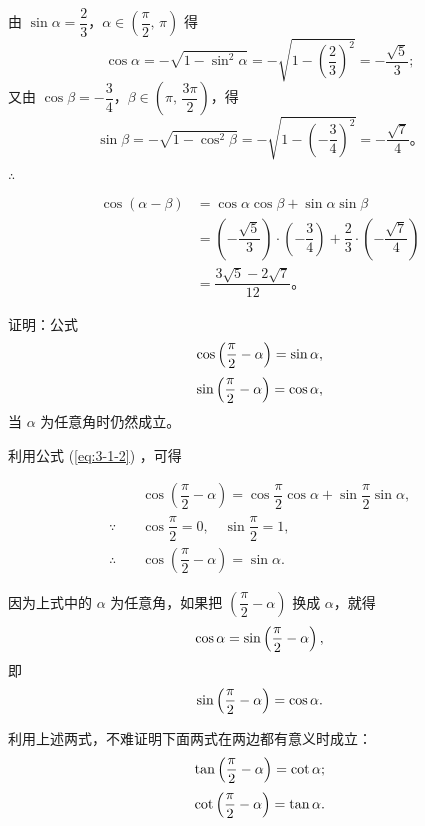 \jie 由 $\sin\alpha = \dfrac 2 3$，$\alpha \in \left( \dfrac \pi 2, \, \pi \right)$ 得
$$\cos\alpha = -\sqrt{1 - \sin^2 \alpha} = -\sqrt{1 - \left( \dfrac 2 3 \right)^2} = -\dfrac{\sqrt 5}{3};$$
又由 $\cos\beta = -\dfrac 3 4$，$\beta \in \left( \pi, \, \dfrac{3\pi}{2} \right)$，得
$$\sin\beta = -\sqrt{1 - \cos^2 \beta} = -\sqrt{1 - \left( -\dfrac 3 4 \right)^2} = -\dfrac{\sqrt 7}{4} \text{。}$$

$\therefore$ \begin{minipage}[t]{9cm}
    \vspace{-1.7em}
    \begin{align*}
        \cos(\alpha - \beta) &= \cos\alpha \cos\beta + \sin\alpha \sin\beta \\
            &= \left( -\dfrac{\sqrt 5}{3} \right) \cdot \left( -\dfrac 3 4 \right) + \dfrac 2 3 \cdot \left( -\dfrac{\sqrt 7}{4} \right) \\
            &= \dfrac{3\sqrt 5 - 2\sqrt 7}{12} \text{。}
    \end{align*}
\end{minipage}

\jiange
\liti 证明：公式
$$\cos\left( \dfrac \pi 2 - \alpha \right) = \sin\alpha , \jiange$$
$$\sin\left( \dfrac \pi 2 - \alpha \right) = \cos\alpha , \jiange$$
当 $\alpha$ 为任意角时仍然成立。

\zhengming 利用公式 (\ref{eq:3-1-2}) ，可得

\begin{minipage}{20em}
    \begin{align*}
        & \cos\left( \dfrac \pi 2 - \alpha \right) = \cos\dfrac \pi 2 \cos\alpha + \sin\dfrac \pi 2 \sin\alpha,\\
        \because \quad & \cos\dfrac \pi 2 = 0, \quad \sin\dfrac \pi 2 = 1, \\
        \therefore \quad & \cos\left( \dfrac \pi 2 - \alpha \right) = \sin\alpha.
    \end{align*}
\end{minipage}

因为上式中的 $\alpha$ 为任意角，如果把 $\left( \dfrac \pi 2 - \alpha \right)$ 换成 $\alpha$，就得
$$\cos\alpha = \sin\left( \dfrac \pi 2 - \alpha \right), \jiange $$
即
\vspace{-1.2em}$$\sin\left( \dfrac \pi 2 - \alpha \right) = \cos\alpha . \jiange$$

利用上述两式，不难证明下面两式在两边都有意义时成立：
$$\tan\left( \dfrac \pi 2 - \alpha \right) = \cot\alpha ; \jiange$$
$$\cot\left( \dfrac \pi 2 - \alpha \right) = \tan\alpha . \jiange$$

